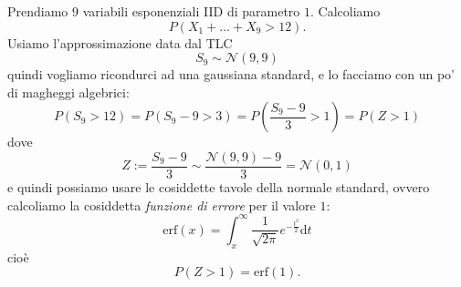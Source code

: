 \documentclass[11pt]{scrartcl}
\newcommand{\dif}{\text{d}}
\begin{document}
	\begin{example}
		Prendiamo $9$ variabili esponenziali IID di parametro $1$. Calcoliamo
		$$P(X_1+\dots+X_9>12).$$
		Usiamo l'approssimazione data dal TLC
		$$S_9\sim \mathcal{N}(9,9)$$
		quindi vogliamo ricondurci ad una gaussiana standard, e lo facciamo con un po' di magheggi algebrici:
		$$P(S_9>12)=P\left(S_9-9>3\right)=P\left(\frac{S_9-9}{3}>1\right)=P(Z>1)$$
		dove 
		$$Z:=\frac{S_9-9}{3}\sim \frac{\mathcal{N}(9,9)-9}{3}=\mathcal{N}(0,1)$$
		e quindi possiamo usare le cosiddette tavole della normale standard, ovvero calcoliamo la cosiddetta \textit{funzione di errore} per il valore $1$:
		$$\text{erf}(x)=\int_{x}^\infty \frac{1}{\sqrt{2\pi}}e^{-\frac{t^2}{2}}\dif t$$
		cioè
		$$P(Z>1)=\text{erf}(1).$$
	\end{example}
\end{document}
